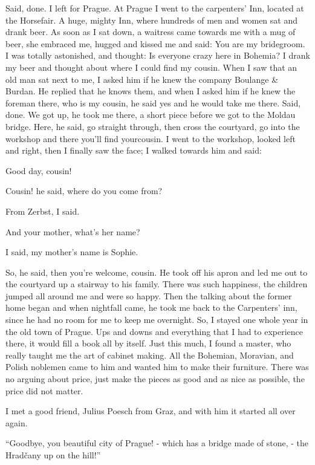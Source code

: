 Said, done. I left for Prague. At Prague I went to the carpenters' Inn, located at the Horsefair. A huge, mighty Inn, where hundreds of men and women sat and drank beer. As soon as I sat down, a waitress came towards me with a mug of beer, she embraced me, hugged and kissed me and said: You are my bridegroom. I was totally astonished, and thought: Is everyone crazy here in Bohemia? I drank my beer and thought about where I could find my cousin. When I saw that an old man sat next to me, I asked him if he knew the company Boulange \& Burdan. He replied that he knows them, and when I asked him if he knew the foreman there, who is my cousin, he said yes and he would take me there. Said, done. We got up, he took me there, a short piece before we got to the Moldau bridge. Here, he said, go straight through, then cross the courtyard, go into the workshop and there you'll find yourcousin. I went to the workshop, looked left and right, then I finally saw the face; I walked towards him and said:

Good day, cousin!

Cousin! he said, where do you come from?

From Zerbst, I said.

And your mother, what's her name?

I said, my mother's name is Sophie.

So, he said, then you're welcome, cousin. He took off his apron and led me out to the courtyard up a stairway to his family. There was such happiness, the children jumped all around me and were so happy. Then the talking about the former home began and when nightfall came, he took me back to the Carpenters' inn, since he had no room for me to keep me overnight. So, I stayed one whole year in the old town of Prague. Ups and downs and everything that I had to experience there, it would fill a book all by itself. Just this much, I found a master, who really taught me the art of cabinet making. All the Bohemian, Moravian, and Polish noblemen came to him and wanted him to make their furniture. There was no arguing about price, just make the pieces as good and as nice as possible, the price did not matter.

I met a good friend, Julius Poesch from Graz, and with him it started all over again.

``Goodbye, you beautiful city of Prague! - which has a bridge made of stone, - the Hradčany up on the hill!''

